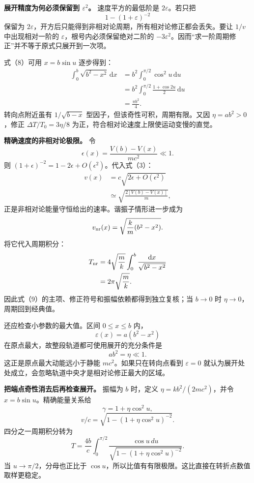 \documentclass[12pt,a4paper,UTF8]{ctexart}
\begin{document}
\textbf{展开精度为何必须保留到 \(\varepsilon^2\)。} 速度平方的最低阶是
\(2\varepsilon\)。若只把 \[
1-(1+\varepsilon)^{-2}
\] 保留为
\(2\varepsilon\)，开方后只能得到非相对论周期，所有相对论修正都会丢失。要让
\(1/v\) 中出现相对一阶的 \(\varepsilon\)，根号内必须保留绝对二阶的
\(-3\varepsilon^2\)。因而``求一阶周期修正''并不等于原式只展开到一次项。

式（8）可用 \(x=b\sin u\) 逐步得到： \[
\begin{aligned}
\int_0^b\sqrt{b^2-x^2}\,\mathrm dx
&=b^2\int_0^{\pi/2}\cos^2u\,\mathrm du\\
&=b^2\int_0^{\pi/2}\frac{1+\cos2u}{2}\,\mathrm du\\
&=\frac{\pi b^2}{4}.
\end{aligned}
\] 转向点附近虽有 \(1/\sqrt{b-x}\) 型因子，但该奇性可积，周期有限。又因
\(\eta=ab^2>0\)，修正 \(\Delta T/T_0=3\eta/8\)
为正，符合相对论速度上限使运动变慢的直觉。

\textbf{精确速度的非相对论极限。} 令 \[
\epsilon(x)=\frac{V(b)-V(x)}{mc^2}\ll1.
\] 则 \((1+\epsilon)^{-2}=1-2\epsilon+O(\epsilon^2)\)。代入式（3）： \[
\begin{aligned}
v(x)
&=c\sqrt{2\epsilon+O(\epsilon^2)}\\
&\simeq\sqrt{\frac{2[V(b)-V(x)]}{m}},
\end{aligned}
\] 正是非相对论能量守恒给出的速率。谐振子情形进一步成为 \[
v_{\rm nr}(x)=\sqrt{\frac km(b^2-x^2)}.
\] 将它代入周期积分： \[
\begin{aligned}
T_{\rm nr}
&=4\sqrt{\frac mk}
\int_0^b\frac{\mathrm dx}{\sqrt{b^2-x^2}}\\
&=2\pi\sqrt{\frac mk}.
\end{aligned}
\] 因此式（9）的主项、修正符号和振幅依赖都得到独立复核；当 \(b\to0\) 时
\(\eta\to0\)，周期回到经典值。

还应检查小参数的最大值。区间 \(0\le x\le b\) 内， \[
\varepsilon(x)=a(b^2-x^2)
\] 在原点最大，故整段轨道都可使用展开的充分条件是 \[
ab^2=\eta\ll1.
\] 这正是原点最大动能远小于静能 \(mc^2\)。如果只在转向点看到
\(\varepsilon=0\)
就认为展开处处成立，会忽略轨道中央才是相对论修正最大的区域。

\textbf{把端点奇性消去后再检查展开。} 振幅为 \(b\) 时，定义
\(\eta=kb^2/(2mc^2)\)，并令 \(x=b\sin u\)。精确能量关系给 \[
\gamma=1+\eta\cos^2u,
\] \[
v/c=\sqrt{1-(1+\eta\cos^2u)^{-2}}.
\] 四分之一周期积分转为 \[
T=\frac{4b}{c}\int_0^{\pi/2}\frac{\cos u\,du}{\sqrt{1-(1+\eta\cos^2u)^{-2}}}.
\] 当 \(u\to\pi/2\)，分母也正比于
\(\cos u\)，所以比值有有限极限。这比直接在转折点数值取样更稳定。
\end{document}
